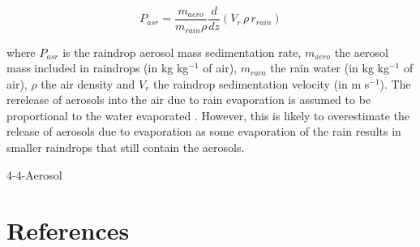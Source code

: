 \begin{equation}
 P_{asr}  = \frac{m_{aero}}{m_{rain}\rho} \frac{d}{d z}(V_r \, \rho \, r_{rain})
\label{eq:sedim}
\end{equation} 

where $P_{asr}$ is the raindrop aerosol mass sedimentation rate, $m_{aero}$ the aerosol mass included in raindrops (in kg kg$^{-1}$ of air), $m_{rain}$ the rain water (in  kg kg$^{-1}$ of air), $\rho$ the air density and $V_r$ the raindrop sedimentation velocity (in m s$^{-1}$).
The re\-release of aerosols into the air due to rain evaporation is assumed to be proportional to the water evaporated \citep{Chin2000}.  However, this is likely to overestimate the release of aerosols due to evaporation as some evaporation of the rain results in smaller raindrops that still contain the aerosols.



\begin{btSect}{4-4-Aerosol}
\section{References}
\btPrintCited
\end{btSect}
